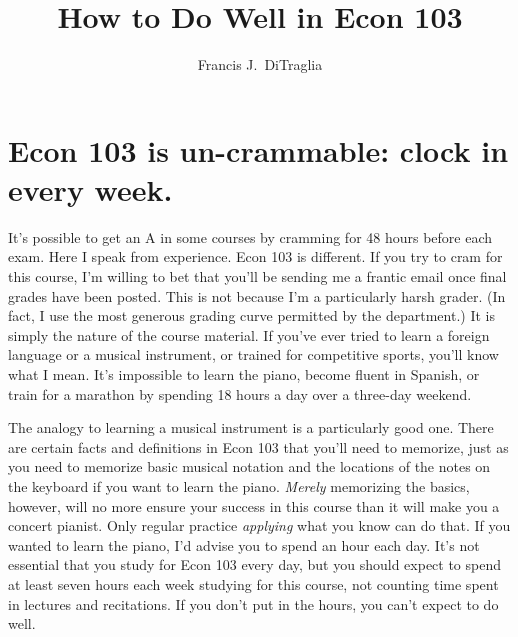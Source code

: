 \documentclass[12pt,letterpaper]{article}
\title{How to Do Well in Econ 103}
\author{Francis J.\ DiTraglia}
\begin{document}
\maketitle


\section{Econ 103 is un-crammable: clock in every week.}
It's possible to get an A in some courses by cramming for 48 hours before each exam. Here I speak from experience. Econ 103 is different. If you try to cram for this course, I'm willing to bet that you'll be sending me a frantic email once final grades have been posted. This is not because I'm a particularly harsh grader. (In fact, I use the most generous grading curve permitted by the department.) It is simply the nature of the course material. If you've ever tried to learn a foreign language or a musical instrument, or trained for competitive sports, you'll know what I mean. It's impossible to learn the piano, become fluent in Spanish, or train for a marathon by spending 18 hours a day over a three-day weekend. 

The analogy to learning a musical instrument is a particularly good one. There are certain facts and definitions in Econ 103 that you'll need to memorize, just as you need to memorize basic musical notation and the locations of the notes on the keyboard if you want to learn the piano. \emph{Merely} memorizing the basics, however, will no more ensure your success in this course than it will make you a concert pianist. Only regular practice \emph{applying} what you know can do that. If you wanted to learn the piano, I'd advise you to spend an hour each day. It's not essential that you study for Econ 103 every day, but you should expect to spend at least seven hours each week studying for this course, not counting time spent in lectures and recitations. If you don't put in the hours, you can't expect to do well.
\end{document}
